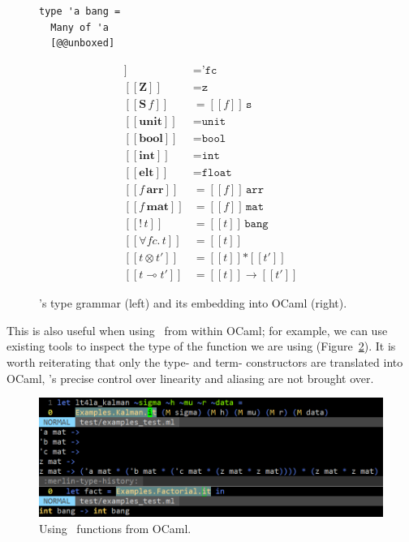 \begin{figure}[t]
\begin{minipage}{.3\textwidth}
\begin{verbatim}
type 'a bang =
  Many of 'a
  [@@unboxed]
        \end{verbatim}
    \end{minipage}
    \begin{minipage}{.3\textwidth}
        \begin{align*}
            [\![ f\!c ]\!] &= \texttt{'fc} \\
            [\![ \textbf{Z} ]\!] &= \texttt{z}\\
            [\![ \textbf{S} \, f ]\!] &= [\![ f ]\!]\, \texttt{s}\\
            [\![ \textbf{unit} ]\!] &= \texttt{unit}\\
            [\![ \textbf{bool} ]\!] &= \texttt{bool}\\
            [\![ \textbf{int} ]\!] &= \texttt{int}\\
            [\![ \textbf{elt} ]\!] &= \texttt{float}\\
            [\![ f\, \textbf{arr} ]\!] &= [\![ f ]\!]\, \texttt{arr}\\
            [\![ f\, \textbf{mat} ]\!] &= [\![ f ]\!]\, \texttt{mat}\\
            [\![ \textbf{!} \, t ]\!] &= [\![ t ]\!]\, \texttt{bang}\\
            [\![ \forall f\!c.\, t ]\!] &= [\![ t ]\!]\\
            [\![ t \otimes t' ]\!] &= [\![ t ]\!] \texttt{*} [\![ t' ]\!]\\
            [\![ t \multimap t' ]\!] &= [\![ t ]\!] \rightarrow [\![ t' ]\!]
        \end{align*}
    \end{minipage}
    \caption{\lang's type grammar (left) and its embedding into OCaml
        (right).}\label{fig:type_grammar}
\end{figure}

This is also useful when using \lang\ from within OCaml; for example, we can
use existing tools to inspect the type of the function we are using
(Figure~\ref{fig:build}). It is worth reiterating that only the type- and term-
constructors are translated into OCaml, \lang's precise control over linearity
and aliasing are not brought over.

\begin{figure}[t]
    \centering
    \includegraphics[width=\textwidth]{impl_build}
    \caption{Using \lang\ functions from OCaml.}\label{fig:build}
\end{figure}

